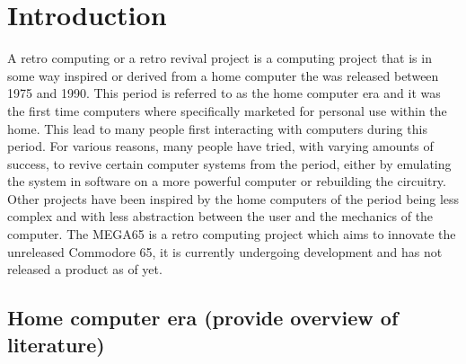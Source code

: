 \chapter{Introduction} %
\label{Chapter1} %

A retro computing or a retro revival project is a computing project that is in some way inspired or derived from a home computer the was released between 1975 and 1990. This period is referred to as the home computer era and it was the first time computers where specifically marketed for personal use within the home. This lead to many people first interacting with computers during this period. For various reasons, many people have tried, with varying amounts of success, to revive certain computer systems from the period, either by emulating the system in software on a more powerful computer or rebuilding the circuitry. Other projects have been inspired by the home computers of the period being less complex and with less abstraction between the user and the mechanics of the computer. The MEGA65 is a retro computing project which aims to innovate the unreleased Commodore 65, it is currently undergoing development and has not released a product as of yet. 

\section{Home computer era (provide overview of literature)}


